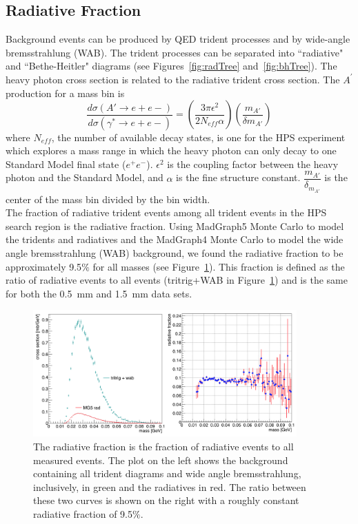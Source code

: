 \subsection{Radiative Fraction}
Background events can be produced by QED trident processes and by wide-angle bremsstrahlung (WAB). The trident processes can be separated into ``radiative" and ``Bethe-Heitler" diagrams (see Figures~\ref{fig:radTree} and~\ref{fig:bhTree}). The heavy photon cross section is related to the radiative trident cross section. The $A^{\prime}$ production for a mass bin is
\begin{equation}
\label{eq:crossSection}
\dfrac{d\sigma(A'\rightarrow e+e-)}{d\sigma(\gamma^*\rightarrow e+e-)} = \left(\dfrac{3\pi\epsilon^{2}}{2N_{eff}\alpha}\right)\left(\dfrac{m_{A'}}{\delta m_{A'}}\right)
\end{equation}
where $N_{eff}$, the number of available decay states, is one for the HPS experiment which explores a mass range in which the heavy photon can only decay to one Standard Model final state ($e^+e^-$). $\epsilon^{2}$ is the coupling factor between the heavy photon and the Standard Model, and $\alpha$ is the fine structure constant. $\dfrac{m_{A'}}{\delta_{m_{A'}}}$ is the center of the mass bin divided by the bin width. \\%
\indent The fraction of radiative trident events among all trident events in the HPS search region is the radiative fraction. Using MadGraph5 Monte Carlo to model the tridents and radiatives and the MadGraph4 Monte Carlo to model the wide angle bremsstrahlung (WAB) background, we found the radiative fraction to be approximately 9.5$\%$ for all masses (see Figure~\ref{fig:radFrac}). This fraction is defined as the ratio of radiative events to all events (tritrig+WAB in Figure~\ref{fig:radFrac}) and is the same for both the 0.5~mm and 1.5~mm data sets.
\begin{figure}[htb]
  \centering
      \includegraphics[width=0.9\textwidth]{pics/searching/radFrac.png}
  \caption[Radiative fraction from Monte Carlo]{The radiative fraction is the fraction of radiative events to all measured events. The plot on the left shows the background containing all trident diagrams and wide angle bremsstrahlung, inclusively, in green and the radiatives in red. The ratio between these two curves is shown on the right with a roughly constant radiative fraction of 9.5$\%$.}
  \label{fig:radFrac}
\end{figure} 

